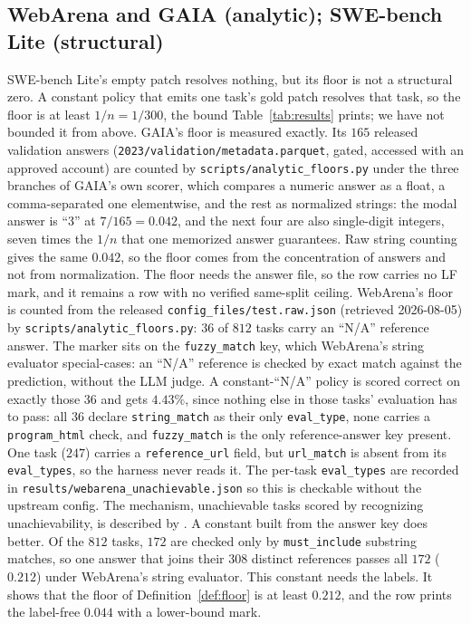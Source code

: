 \documentclass{article}
\theoremstyle{plain}
\theoremstyle{definition}
\begin{document}
\subsection{WebArena and GAIA (analytic); SWE-bench Lite (structural)}
SWE-bench Lite's empty patch resolves nothing, but its floor is not a structural zero. A constant policy that emits one task's gold patch resolves that task, so the floor is at least $1/n = 1/300$, the bound Table~\ref{tab:results} prints; we have not bounded it from above. GAIA's floor is measured exactly. Its $165$ released validation answers (\texttt{2023/validation/metadata.parquet}, gated, accessed with an approved account) are counted by \texttt{scripts/analytic\_floors.py} under the three branches of GAIA's own scorer, which compares a numeric answer as a float, a comma-separated one elementwise, and the rest as normalized strings: the modal answer is ``3'' at $7/165 = 0.042$, and the next four are also single-digit integers, seven times the $1/n$ that one memorized answer guarantees. Raw string counting gives the same $0.042$, so the floor comes from the concentration of answers and not from normalization. The floor needs the answer file, so the row carries no LF mark, and it remains a row with no verified same-split ceiling. WebArena's floor is counted from the released \texttt{config\_files/test.raw.json} (retrieved 2026-08-05) by \texttt{scripts/analytic\_floors.py}: $36$ of $812$ tasks carry an ``N/A'' reference answer. The marker sits on the \texttt{fuzzy\_match} key, which WebArena's string evaluator special-cases: an ``N/A'' reference is checked by exact match against the prediction, without the LLM judge. A constant-``N/A'' policy is scored correct on exactly those $36$ and gets $4.43\%$, since nothing else in those tasks' evaluation has to pass: all $36$ declare \texttt{string\_match} as their only \texttt{eval\_type}, none carries a \texttt{program\_html} check, and \texttt{fuzzy\_match} is the only reference-answer key present. One task ($247$) carries a \texttt{reference\_url} field, but \texttt{url\_match} is absent from its \texttt{eval\_types}, so the harness never reads it. The per-task \texttt{eval\_types} are recorded in \texttt{results/webarena\_unachievable.json} so this is checkable without the upstream config. The mechanism, unachievable tasks scored by recognizing unachievability, is described by \citet{zhou2024webarena}. A constant built from the answer key does better. Of the $812$ tasks, $172$ are checked only by \texttt{must\_include} substring matches, so one answer that joins their $308$ distinct references passes all $172$ ($0.212$) under WebArena's string evaluator. This constant needs the labels. It shows that the floor of Definition~\ref{def:floor} is at least $0.212$, and the row prints the label-free $0.044$ with a lower-bound mark.
\end{document}
